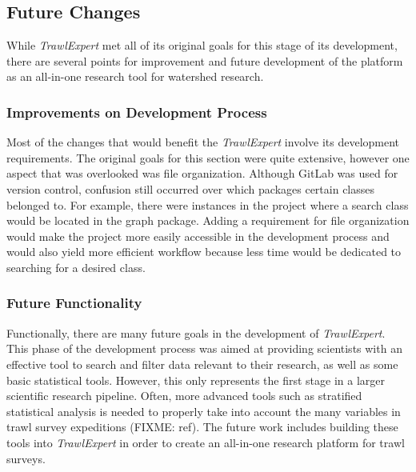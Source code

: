 \documentclass{article}
\begin{document}
\subsection{Future Changes}
While \textit{TrawlExpert} met all of its original goals for this stage of its development, there are several points for improvement and future development of the platform as an all-in-one research tool for watershed research.

\subsubsection{Improvements on Development Process}
Most of the changes that would benefit the \textit{TrawlExpert} involve its development requirements. The original goals for this section were quite extensive, however one aspect that was overlooked was file organization. Although GitLab was used for version control, confusion still occurred over which packages certain classes belonged to. For example, there were instances in the project where a search class would be located in the graph package. Adding a requirement for file organization would make the project more easily accessible in the development process and would also yield more efficient workflow because less time would be dedicated to searching for a desired class. 

\subsubsection{Future Functionality}
Functionally, there are many future goals in the development of \textit{TrawlExpert}. This phase of the development process was aimed at providing scientists with an effective tool to search and filter data relevant to their research, as well as some basic statistical tools. However, this only represents the first stage in a larger scientific research pipeline. Often, more advanced tools such as stratified statistical analysis is needed to properly take into account the many variables in trawl survey expeditions (FIXME: ref). The future work includes building these tools into \textit{TrawlExpert} in order to create an all-in-one research platform for trawl surveys.

\clearpage


\end{document}
